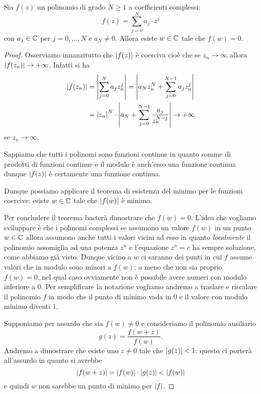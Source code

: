 \begin{theorem}
Sia $f(z)$ un polinomio di grado $N\ge 1$ a coefficienti complessi:
\[
  f(z) = \sum_{j=0}^N a_j \cdot z^j
\]
con $a_j\in \mathbb C$ per $j=0,\dots,N$ e $a_N \neq 0$.
Allora esiste $w\in \mathbb C$ tale che $f(w) = 0$.
\end{theorem}
%
\begin{proof}
Osserviamo innanzitutto che ${\left|f(z)\right|}$ è coerciva cioè che
se $z_n \to \infty$ allora ${\left|f(z_n)\right|}\to +\infty$.
Infatti si ha
\begin{align*}
  {\left|f(z_n)\right|}
  &= {\left|\sum_{j=0}^N a_j z_n^j\right|}
  = {\left|a_N z_n^N  + \sum_{j=0}^{N-1} a_j z_n^j\right|}\\
  &= {\left|z_n\right|}^N \cdot {\left|a_N + \sum_{j=0}^{N-1} \frac{a_j}{z_n^{N-j}}\right|}
  \to +\infty
\end{align*}
se $z_n \to \infty$.

Sappiamo che tutti i polinomi sono funzioni continue in quanto somme di prodotti di funzioni continue e il modulo è anch'esso una funzione continua dunque ${\left|f(z)\right|}$ è certamente una funzione continua.

Dunque possiamo applicare il teorema di esistenza del minimo per le funzioni coercive: esiste $w\in \mathbb C$ tale che ${\left|f(w)\right|}$ è minimo.

Per concludere il teorema basterà dimostrare che $f(w)=0$.
L'idea che vogliamo sviluppare è che i polinomi complessi se assumono un valore $f(w)$ in un punto $w\in \mathbb C$ allora assumono anche tutti i valori vicini ad esso in quanto \emph{localmente} il polinomio assomiglia ad una potenza $z^n$ e l'equazione $z^n=c$ ha sempre soluzione, come abbiamo già visto. Dunque vicino a $w$ ci saranno dei punti in cui $f$ assume valori che in modulo sono minori a $f(w)$: a meno che non sia proprio $f(w)=0$, nel qual caso ovviamente non è possibile avere numeri con modulo inferiore a $0$.
Per semplificare la notazione vogliamo andremo a traslare e riscalare il polinomio $f$ in modo che il punto di minimo vada in $0$ e il valore con modulo minimo diventi $1$.

Supponiamo per assurdo che sia $f(w)\neq 0$ e consideriamo il polinomio ausiliario
\[
  g(z) = \frac{f(w+z)}{f(w)}.
\]
Andremo a dimostrare che esiste uno $z\neq 0$ tale che ${\left|g(z)\right|}<1$:
questo ci porterà all'assurdo in quanto si avrebbe
\[
{\left|f(w+z)\right|} = {\left|f(w)\right|} \cdot {\left|g(z)\right|} < {\left|f(w)\right|}
\]
e quindi $w$ non sarebbe un punto di minimo per ${\left|f\right|}$.


\end{proof}

